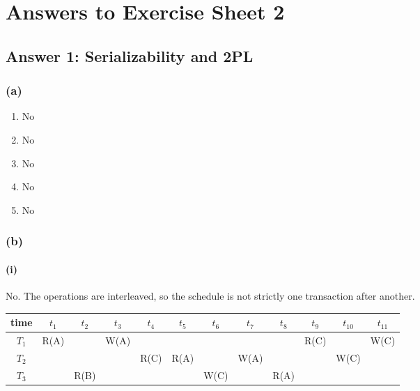 \documentclass[11pt]{article}
\begin{document}

\section*{Answers to Exercise Sheet 2}

\subsection*{Answer 1: Serializability and 2PL}

\subsubsection*{(a)}
\begin{enumerate}
  \item No
  \item No
  \item No
  \item No
  \item No
\end{enumerate}

\subsubsection*{(b)}
\paragraph{(i)}
No. The operations are interleaved, so the schedule is not strictly one transaction after another.

\begin{center}
\begin{tabular}{|c|c|c|c|c|c|c|c|c|c|c|c|}
\hline
\textbf{time} & $t_1$ & $t_2$ & $t_3$ & $t_4$ & $t_5$ & $t_6$ & $t_7$ & $t_8$ & $t_9$ & $t_{10}$ & $t_{11}$ \\
\hline
$T_1$ & R(A) &       & W(A) &       &       &       &  &       & R(C) &       & W(C) \\
\hline
$T_2$ &      &       &      & R(C) & R(A) &       &  W(A)  &       &      & W(C) &       \\
\hline
$T_3$ &      & R(B) &      &       &      & W(C) &      & R(A) &      &      &       \\
\hline
\end{tabular}
\end{center}
\end{document}
